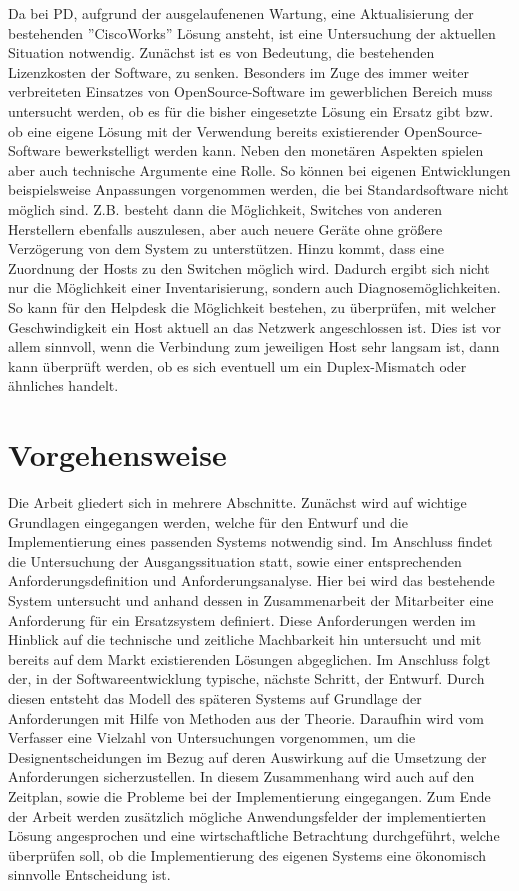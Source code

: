 Da bei PD, aufgrund der ausgelaufenenen Wartung, eine Aktualisierung der bestehenden ''CiscoWorks'' Lösung ansteht, ist eine Untersuchung der aktuellen Situation notwendig.
Zunächst ist es von Bedeutung, die bestehenden Lizenzkosten der Software, zu senken.
Besonders im Zuge des immer weiter verbreiteten Einsatzes von OpenSource-Software im gewerblichen Bereich muss untersucht werden, ob es für die bisher eingesetzte Lösung ein Ersatz gibt bzw. ob eine eigene Lösung mit der Verwendung bereits existierender OpenSource-Software bewerkstelligt werden kann.
Neben den monetären Aspekten spielen aber auch technische Argumente eine Rolle.
So können bei eigenen Entwicklungen beispielsweise Anpassungen vorgenommen werden, die bei Standardsoftware nicht möglich sind.
Z.B. besteht dann die Möglichkeit, Switches von anderen Herstellern ebenfalls auszulesen, aber auch neuere Geräte ohne größere Verzögerung von dem System zu unterstützen.
Hinzu kommt, dass eine Zuordnung der Hosts zu den Switchen möglich wird.
Dadurch ergibt sich nicht nur die Möglichkeit einer Inventarisierung, sondern auch Diagnosemöglichkeiten. So kann für den Helpdesk die Möglichkeit bestehen, zu überprüfen, mit welcher Geschwindigkeit ein Host aktuell an das Netzwerk angeschlossen ist.
Dies ist vor allem sinnvoll, wenn die Verbindung zum jeweiligen Host sehr langsam ist, dann kann überprüft werden, ob es sich eventuell um ein Duplex-Mismatch oder ähnliches handelt.


\section{Vorgehensweise}

Die Arbeit gliedert sich in mehrere Abschnitte.
Zunächst wird auf wichtige Grundlagen eingegangen werden, welche für den Entwurf und die Implementierung eines passenden Systems notwendig sind.
Im Anschluss findet die Untersuchung der Ausgangssituation statt, sowie einer entsprechenden Anforderungsdefinition und Anforderungsanalyse.
Hier bei wird das bestehende System untersucht und anhand dessen in Zusammenarbeit der Mitarbeiter eine Anforderung für ein Ersatzsystem definiert.
Diese Anforderungen werden im Hinblick auf die technische und zeitliche Machbarkeit hin untersucht und mit bereits auf dem Markt existierenden Lösungen abgeglichen.
Im Anschluss folgt der, in der Softwareentwicklung typische, nächste Schritt, der Entwurf.
Durch diesen entsteht das Modell des späteren Systems auf Grundlage der Anforderungen mit Hilfe von Methoden aus der Theorie.
Daraufhin wird vom Verfasser eine Vielzahl von Untersuchungen vorgenommen, um die Designentscheidungen im Bezug auf deren Auswirkung auf die Umsetzung der Anforderungen sicherzustellen.
In diesem Zusammenhang wird auch auf den Zeitplan, sowie die Probleme bei der Implementierung eingegangen.
Zum Ende der Arbeit werden zusätzlich mögliche Anwendungsfelder der implementierten Lösung angesprochen und eine wirtschaftliche Betrachtung durchgeführt, welche überprüfen soll, ob die Implementierung des eigenen Systems eine ökonomisch sinnvolle Entscheidung ist.\\
